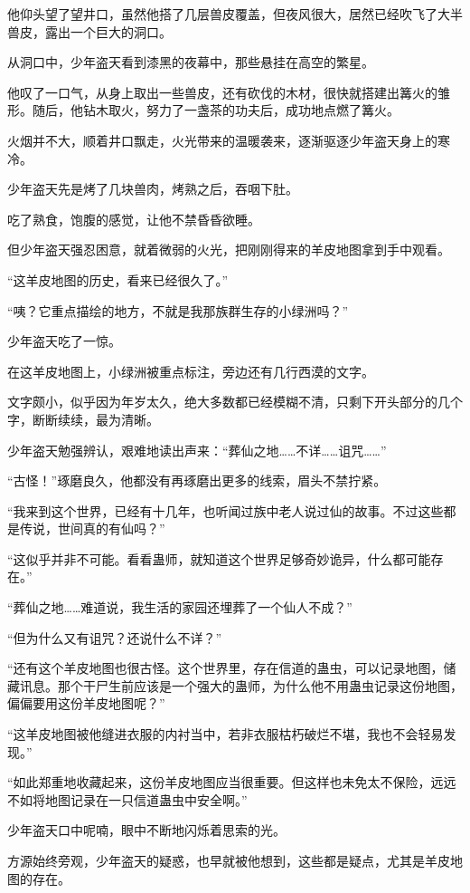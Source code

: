 \begin{this_body}
他仰头望了望井口，虽然他搭了几层兽皮覆盖，但夜风很大，居然已经吹飞了大半兽皮，露出一个巨大的洞口。

从洞口中，少年盗天看到漆黑的夜幕中，那些悬挂在高空的繁星。

他叹了一口气，从身上取出一些兽皮，还有砍伐的木材，很快就搭建出篝火的雏形。随后，他钻木取火，努力了一盏茶的功夫后，成功地点燃了篝火。

火烟并不大，顺着井口飘走，火光带来的温暖袭来，逐渐驱逐少年盗天身上的寒冷。

少年盗天先是烤了几块兽肉，烤熟之后，吞咽下肚。

吃了熟食，饱腹的感觉，让他不禁昏昏欲睡。

但少年盗天强忍困意，就着微弱的火光，把刚刚得来的羊皮地图拿到手中观看。

“这羊皮地图的历史，看来已经很久了。”

“咦？它重点描绘的地方，不就是我那族群生存的小绿洲吗？”

少年盗天吃了一惊。

在这羊皮地图上，小绿洲被重点标注，旁边还有几行西漠的文字。

文字颇小，似乎因为年岁太久，绝大多数都已经模糊不清，只剩下开头部分的几个字，断断续续，最为清晰。

少年盗天勉强辨认，艰难地读出声来：“葬仙之地……不详……诅咒……”

“古怪！”琢磨良久，他都没有再琢磨出更多的线索，眉头不禁拧紧。

“我来到这个世界，已经有十几年，也听闻过族中老人说过仙的故事。不过这些都是传说，世间真的有仙吗？”

“这似乎并非不可能。看看蛊师，就知道这个世界足够奇妙诡异，什么都可能存在。”

“葬仙之地……难道说，我生活的家园还埋葬了一个仙人不成？”

“但为什么又有诅咒？还说什么不详？”

“还有这个羊皮地图也很古怪。这个世界里，存在信道的蛊虫，可以记录地图，储藏讯息。那个干尸生前应该是一个强大的蛊师，为什么他不用蛊虫记录这份地图，偏偏要用这份羊皮地图呢？”

“这羊皮地图被他缝进衣服的内衬当中，若非衣服枯朽破烂不堪，我也不会轻易发现。”

“如此郑重地收藏起来，这份羊皮地图应当很重要。但这样也未免太不保险，远远不如将地图记录在一只信道蛊虫中安全啊。”

少年盗天口中呢喃，眼中不断地闪烁着思索的光。

方源始终旁观，少年盗天的疑惑，也早就被他想到，这些都是疑点，尤其是羊皮地图的存在。


\end{this_body}

